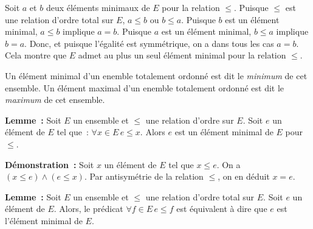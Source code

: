     Soit $a$ et $b$ deux éléments minimaux de $E$ pour la relation $\leq$.
    Puisque $\leq$ est une relation d'ordre total sur $E$, $a \leq b$ ou $b \leq a$. 
    Puisque $b$ est un élément minimal, $a \leq b$ implique $a = b$.
    Puisque $a$ est un élément minimal, $b \leq a$ implique $b = a$.
    Donc, et puisque l'égalité est symmétrique, on a dans tous les cas $a = b$.
    Cela montre que $E$ admet au plus un seul élément minimal pour la relation $\leq$.

   \done 

\medskip

Un élément minimal d'un enemble totalement ordonné est dit le \textit{minimum} de cet ensemble.
Un élément maximal d'un enemble totalement ordonné est dit le \textit{maximum} de cet ensemble.

\medskip

\noindent\textbf{Lemme :} Soit $E$ un ensemble et $\leq$ une relation d'ordre sur $E$. 
    Soit $e$ un élément de $E$ tel que : $\forall x \in E \, e \leq x$. 
    Alors $e$ est un élément minimal de $E$ pour $\leq$.

\medskip

\noindent\textbf{Démonstration :} 
    Soit $x$ un élément de $E$ tel que $x \leq e$. 
    On a $(x \leq e) \wedge (e \leq x)$. 
    Par antisymétrie de la relation $\leq$, on en déduit $x = e$.

   \done 

\medskip

\noindent\textbf{Lemme :} Soit $E$ un ensemble et $\leq$ une relation d'ordre total sur $E$. 
    Soit $e$ un élément de $E$.
    Alors, le prédicat $\forall f \in E \, e \leq f$ est équivalent à dire que $e$ est l'élément minimal de $E$.

\medskip


